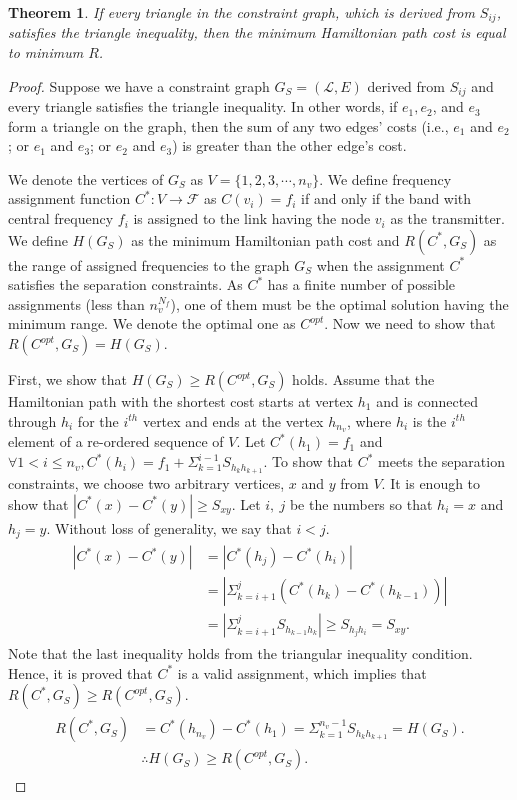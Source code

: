\documentclass[10pt,twocolumn,twoside]{JCNtran}
\newcommand{\tbirkan}[1]{#1}
\newcommand{\setFreq}{\mathcal{F}}
\newcommand{\setLink}{\mathcal{L}}
\newcommand{\freqsepQuantized}[2]{S_{#1#2}}
\newcommand{\rangefa}{R}
\newtheorem{theorem}{Theorem}
\begin{document}
\begin{theorem}
If every triangle in the constraint graph, which is derived from $\freqsepQuantized{i}{j}$, satisfies the triangle inequality, then the  minimum Hamiltonian path cost \tbirkan{is equal to minimum} $\rangefa$.
\end{theorem}
\begin{proof}
Suppose we have a constraint graph $G_S=(\setLink, E)$ derived from $\freqsepQuantized{i}{j}$ and every triangle satisfies the triangle inequality. In other words, if $e_1, e_2$, and  $e_3$ form a triangle on the graph, then the sum of any two edges' costs (i.e., $e_1$ and $e_2$; or $e_1$ and $e_3$; or $e_2$ and $e_3$) is greater than the other edge's cost. 

We denote the vertices of $G_S$ as $V=\{1,2,3,\cdots,n_{v}\}$. We define frequency assignment function $C^{*}\!:\!V\!\rightarrow\!{\setFreq}$ as $C(v_i)=f_i$ if and only if the band with central frequency $f_i$ is assigned to the link having the node $v_i$ as the transmitter. We define $H(G_S)$ as the minimum Hamiltonian path cost and $R(C^{*},G_S)$ as the range of assigned frequencies to the graph $G_S$ when the assignment $C^*$ satisfies the separation constraints. As $C^*$ has a finite number of possible assignments (less than $n_{v}^{N_{f}}$), one of them must be the optimal solution having the minimum range. We denote the optimal one as $C^{opt}$. Now we need to show that $R(C^{opt},G_S)=H(G_S)$.

First, we show that $H(G_S)\!\geq\!{R(C^{opt},G_S)}$ holds. Assume that the Hamiltonian path with the shortest cost starts at vertex $h_1$ and is connected through $h_i$ for the $i^{th}$ vertex and ends at the vertex $h_{n_v}$, where $h_{i}$ is the $i^{th}$ element of a re-ordered sequence of $V$. Let $C^{*}(h_1)=f_1$ and $\forall{1}\!<\!i\!\leq\!{n_v}, C^{*}(h_i)=f_{1}+\Sigma_{k=1}^{i-1}{S_{h_{k}h_{k+1}}}$. To show that $C^{*}$ meets the separation constraints, we choose two arbitrary  vertices, $x$ and $y$ from $V$. It is enough to show that $|C^{*}(x)-C^{*}(y)|\geq{S_{xy}}$. Let $i,~j$ be the numbers so that $h_{i}\!=\!x$ and $h_{j}\!=\!y$. Without loss of generality, we say that $i\!<\!j$.
\begin{align}
\begin{split}
|C^{*}(x)-C^{*}(y)|&=|C^{*}(h_j)-C^{*}(h_i)| \\
&=|\Sigma_{k=i+1}^{j}(C^{*}(h_k)-C^{*}(h_{k-1}))| \\
&=|\Sigma_{k=i+1}^{j}S_{h_{k-1}h_{k}}|\geq{S_{h_{j}h_{i}}}=S_{xy}.
\nonumber
\end{split}
\end{align}
Note that the last inequality holds from the triangular inequality condition. Hence, it is proved that $C^{*}$ is a valid assignment, which implies that $R(C^*,G_S)\geq{R(C^{opt},G_S)}$. 
\begin{align}
\begin{split}
\nonumber
R(C^*,G_S)&\!=\!C^{*}(h_{n_v})\!-\!C^{*}(h_{1})\!=\!\Sigma_{k=1}^{n_v-1}S_{h_{k}h_{k+1}}\!=\!H(G_S).\\ 
&\therefore{H(G_S)\geq{R}(C^{opt},G_S)}.
\end{split}
\end{align}


\end{proof}
\end{document}
